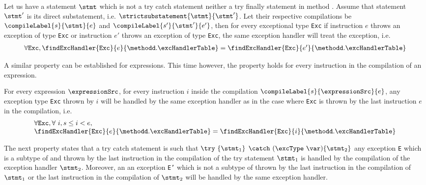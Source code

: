 \begin{compProp}\label{compile:prop:compProp8}
 Let us have a statement $\stmt$ which is not a try catch statement  neither a try finally statement in method \methodd. Assume that 
  statement $\stmt'$ is its direct substatement, i.e. 
$\strictsubstatement{\stmt}{\stmt'} $. Let 
 their respective compilations be  $\compileLabel{s}{\stmt}{e}$ and  $\compileLabel{s'}{\stmt'}{e'}$, then for every exceptional type \mbox{\rm\tt{Exc}} 
if instruction $e$ throws an exception of type \mbox{\rm\tt{Exc}} or  instruction $e'$ throws an exception of type \mbox{\rm\tt{Exc}},
the same exception handler will treat the exception, i.e.
$$ \begin{array}{l}
          \forall \mbox{\rm\tt{Exc}}, \findExcHandler{\mbox{\rm\tt{Exc}} }{e}{\methodd.\excHandlerTable} = 
	 \findExcHandler{\mbox{\rm\tt{Exc}} }{e'}{\methodd.\excHandlerTable} 
   \end{array}
$$


\end{compProp}

A similar property can be established for expressions. This time however, the property holds for
every instruction in the compilation of an expression.
 
\begin{compProp}\label{compile:prop:compProp9}
  For every expression $\expressionSrc$,
  for every instruction $i$ inside the compilation  $\compileLabel{s}{\expressionSrc}{e}$,
  any exception type \mbox{\rm\tt{Exc}} thrown by  $i$  will be handled by the same exception handler 
  as in the case where \mbox{\rm\tt{Exc}}   is thrown by the last instruction $e$ in the compilation, i.e.
$$ \begin{array}{l}
          \forall \mbox{\rm\tt{Exc}}, \forall  \ i, s \le i < e , \\
	   \findExcHandler{\mbox{\rm\tt{Exc}} }{e}{\methodd.\excHandlerTable} = 
	  \findExcHandler{\mbox{\rm\tt{Exc}} }{i}{\methodd.\excHandlerTable} 
   \end{array}
$$
\end{compProp}

The next property states that a try catch statement is such that $ \try \ \{ \stmt_1 \} $ $ \catch \ (\excType \ \var )\{ \stmt_2 \}  $ 
any exception \texttt{E} which is a subtype of \excType{} and thrown by  the last instruction in the compilation of the try statement $ \stmt_1 $ is handled by the 
compilation of the exception handler $\stmt_2$. Moreover, an 
 an exception \texttt{E'} which is not a subtype of \excType{} thrown by the  last instruction in the compilation of $\stmt_1$
or the last instruction  in the compilation of $\stmt_2$ will be handled by the same exception handler. 

